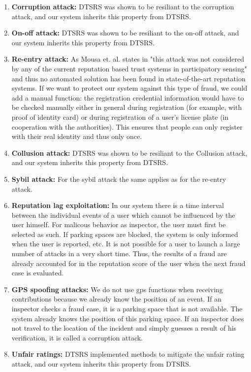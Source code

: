 \documentclass[
a4paper,     %
titlepage,   %
14pt         %
]{scrartcl}  %
\theoremstyle{mystyle}
\begin{document}
\begin{enumerate}
\item \textbf{Corruption attack:} DTSRS was shown to be resiliant to the corruption attack, and our system inherits this property from DTSRS.
\item \textbf{On-off attack:} DTSRS was shown to be resiliant to the on-off attack, and our system inherits this property from DTSRS.
\item \textbf{Re-entry attack:} As Mousa et. al. states in \cite{mousa2015trust} "this attack was not considered by any of the current reputation based trust systems in participatory sensing" and thus no automated solution has been found in state-of-the-art reputation systems. If we want to protect our system against this type of fraud, we could add a manual function: the registration credential information would have to be checked manually either in general during registration  (for example, with proof of identity card) or during registration of a user's license plate (in cooperation with the authorities). This ensures that people can only register with their real identity and thus only once.
\item \textbf{Collusion attack:} DTSRS was shown to be resiliant to the Collusion attack, and our system inherits this property from DTSRS.
\item \textbf{Sybil attack:} For the sybil attack the same applies as for the re-entry attack.
\item \textbf{Reputation lag exploitation:} In our system there is a time interval between the individual events of a user which cannot be influenced by the user himself. For malicous behavior as inspector, the user must first be selected as such. If parking spaces are blocked, the system is only informed when the user is reported, etc. It is not possible for a user to launch a large number of attacks in a very short time. Thus, the results of a fraud are already accounted for in the reputation score of the user when the next fraud case is evaluated.
\item \textbf{GPS spoofing attacks:} We do not use gps functions when receiving contributions because we already know the position of an event. If an inspector checks a fraud case, it is a parking space that is not available. The system already knows the position of this parking space. If an inspector does not travel to the location of the incident and simply guesses a result of his verification, it is called a corruption attack.
\item \textbf{Unfair ratings:} DTSRS implemented methods to mitigate the unfair rating attack, and our system inherits this property from DTSRS.

\end{enumerate}
\end{document}
